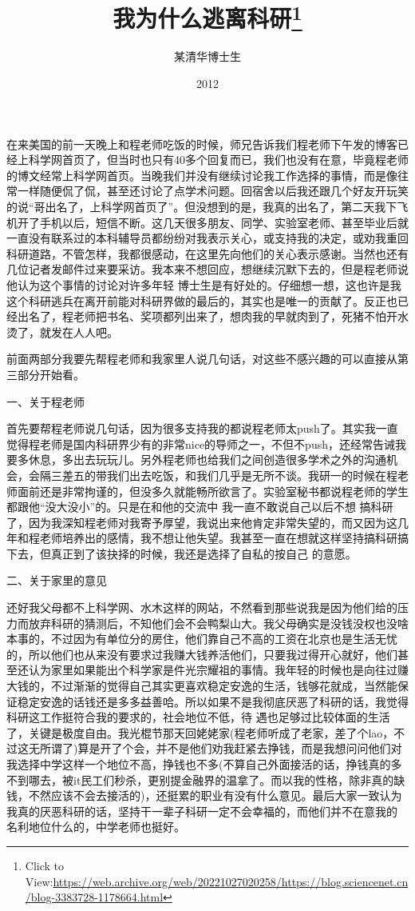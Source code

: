 \documentclass{article}
\title{我为什么逃离科研\footnote{Click to View:\url{https://web.archive.org/web/20221027020258/https://blog.sciencenet.cn/blog-3383728-1178664.html}}}
\author{某清华博士生}
\date{2012}
\begin{document}

\maketitle


\Large

﻿在来美国的前一天晚上和程老师吃饭的时候，师兄告诉我们程老师下午发的博客已经上科学网首页了，但当时也只有40多个回复而已，我们也没有在意，毕竟程老师的博文经常上科学网首页。当晚我们并没有继续讨论我工作选择的事情，而是像往常一样随便侃了侃，甚至还讨论了点学术问题。回宿舍以后我还跟几个好友开玩笑的说“哥出名了，上科学网首页了”。但没想到的是，我真的出名了，第二天我下飞机开了手机以后，短信不断。这几天很多朋友、同学、实验室老师、甚至毕业后就一直没有联系过的本科辅导员都纷纷对我表示关心，或支持我的决定，或劝我重回科研道路，不管怎样，我都很感动，在这里先向他们的关心表示感谢。当然也还有几位记者发邮件过来要采访。我本来不想回应，想继续沉默下去的，但是程老师说他认为这个事情的讨论对许多年轻
\newpage
博士生是有好处的。仔细想一想，这也许是我这个科研逃兵在离开前能对科研界做的最后的，其实也是唯一的贡献了。反正也已经出名了，程老师把书名、奖项都列出来了，想肉我的早就肉到了，死猪不怕开水
烫了，就发在人人吧。 

前面两部分我要先帮程老师和我家里人说几句话，对这些不感兴趣的可以直接从第三部分开始看。
 


一、关于程老师 

首先要帮程老师说几句话，因为很多支持我的都说程老师太push了。其实我一直觉得程老师是国内科研界少有的非常nice的导师之一，不但不push，还经常告诫我要多休息，多出去玩玩儿。另外程老师也给我们之间创造很多学术之外的沟通机会，会隔三差五的带我们出去吃饭，和我们几乎是无所不谈。我研一的时候在程老师面前还是非常拘谨的，但没多久就能畅所欲言了。实验室秘书都说程老师的学生都跟他“没大没小”的。只是在和他的交流中
\newpage
我一直不敢说自己以后不想 搞科研了，因为我深知程老师对我寄予厚望，我说出来他肯定非常失望的，而又因为这几年和程老师培养出的感情，我不想让他失望。我甚至一直在想就这样坚持搞科研搞下去，但真正到了该抉择的时候，我还是选择了自私的按自己
的意愿。 


二、关于家里的意见 

还好我父母都不上科学网、水木这样的网站，不然看到那些说我是因为他们给的压力而放弃科研的猜测后，不知他们会不会鸭梨山大。我父母确实是没钱没权也没啥本事的，不过因为有单位分的房住，他们靠自己不高的工资在北京也是生活无忧的，所以他们也从来没有要求过我赚大钱养活他们，只要我过得开心就好，他们甚至还认为家里如果能出个科学家是件光宗耀祖的事情。我年轻的时候也是向往过赚大钱的，不过渐渐的觉得自己其实更喜欢稳定安逸的生活，钱够花就成，当然能保证稳定安逸的话钱还是多多益善哈。所以如果不是我彻底厌恶了科研的话，我觉得科研这工作挺符合我的要求的，社会地位不低，待
\newpage
遇也足够过比较体面的生活了，关键是极度自由。我光棍节那天回姥姥家(程老师听成了老家，差了个lao，不过这无所谓了)算是开了个会，并不是他们劝我赶紧去挣钱，而是我想问问他们对我选择中学这样一个地位不高，挣钱也不多(不算自己外面接活的话，挣钱真的多不到哪去，被it民工们秒杀，更别提金融界的温拿了。而以我的性格，除非真的缺钱，不然应该不会去接活的)，还挺累的职业有没有什么意见。最后大家一致认为我真的厌恶科研的话，坚持干一辈子科研一定不会幸福的，而他们并不在意我的
名利地位什么的，中学老师也挺好。 
\end{document}

